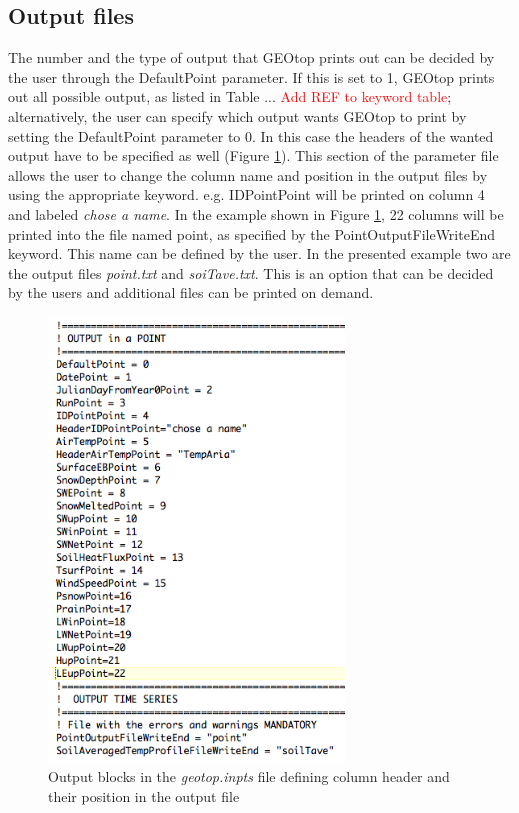 \subsection{Output files}
The number and the type of output that GEOtop prints out can be decided by the user through the DefaultPoint parameter. If this is set  to 1, GEOtop prints out all possible output, as listed in Table ... \textcolor{red}{Add REF to keyword table}; alternatively, the user can specify which output wants GEOtop to print by setting the DefaultPoint parameter to 0. In this case the headers of the wanted output have to be specified as well (Figure \ref{output}). This section of the parameter file allows the user to change the column name and position in the output files by using the appropriate keyword. e.g. IDPointPoint will be printed on column 4 and labeled {\it chose a name}. In the example shown in Figure \ref{output}, 22 columns will be printed into the file named point, as specified by the PointOutputFileWriteEnd keyword. This name can be defined by the user.
In the presented example two are the output files {\it point.txt} and {\it soiTave.txt}. This is an option that can be decided by the users and additional files can be printed on demand.

\begin{figure}[!h]
\begin{center}
   \includegraphics[width=0.7\textwidth]{./images/pic_template/output_PAR.png}
    \caption{Output blocks in the {\it geotop.inpts} file defining column header and their position in the output file} \label{output}
\end{center}
\end{figure}

